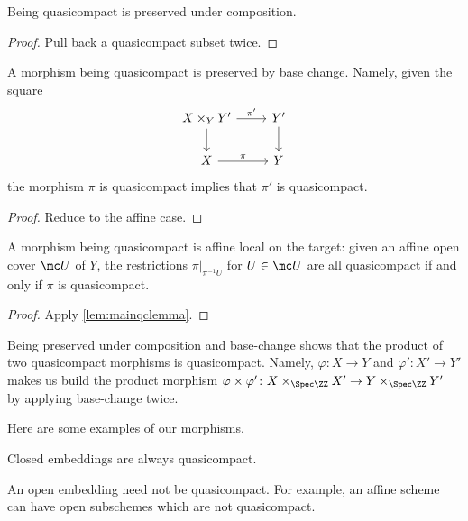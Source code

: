 \documentclass[../notes.tex]{subfiles}
\begin{document}
\begin{corollary}
	Being quasicompact is preserved under composition.
\end{corollary}
\begin{proof}
	Pull back a quasicompact subset twice.
\end{proof}
\begin{corollary}
	A morphism being quasicompact is preserved by base change. Namely, given the square
	\[\begin{tikzcd}
		{X\times_YY'} & {Y'} \\
		X & Y
		\arrow["\pi", from=2-1, to=2-2]
		\arrow["{\pi'}", from=1-1, to=1-2]
		\arrow[from=1-1, to=2-1]
		\arrow[from=1-2, to=2-2]
	\end{tikzcd}\]
	the morphism $\pi$ is quasicompact implies that $\pi'$ is quasicompact.
\end{corollary}
\begin{proof}
	Reduce to the affine case.
\end{proof}
\begin{corollary}
	A morphism being quasicompact is affine local on the target: given an affine open cover $\mc U$ of $Y$, the restrictions $\pi|_{\pi^{-1}U}$ for $U\in\mc U$ are all quasicompact if and only if $\pi$ is quasicompact.
\end{corollary}
\begin{proof}
	Apply \autoref{lem:mainqclemma}.
\end{proof}
\begin{remark}
	Being preserved under composition and base-change shows that the product of two quasicompact morphisms is quasicompact. Namely, $\varphi\colon X\to Y$ and $\varphi'\colon X'\to Y'$ makes us build the product morphism $\varphi\times\varphi'\colon X\times_{\Spec\ZZ}X'\to Y\times_{\Spec\ZZ}Y'$ by applying base-change twice.
\end{remark}
Here are some examples of our morphisms.
\begin{example}
	Closed embeddings are always quasicompact.
\end{example}
\begin{nex}
	An open embedding need not be quasicompact. For example, an affine scheme can have open subschemes which are not quasicompact.
\end{nex}
\end{document}
